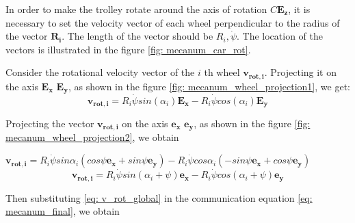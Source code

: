 \documentclass[oneside,final,14pt]{extreport}
\newcommand{\bs}{\boldsymbol}
\begin{document}
In order to make the trolley rotate around the axis of rotation $ C \bs{E_{z}} $, it is necessary to set the velocity vector of each wheel perpendicular to the radius of the vector $ \bs{R_{i}} $. The length of the vector should be $ R_{i}, \dot{\psi} $. The location of the vectors is illustrated in the figure \ref{fig: mecanum_car_rot}.

\begin{figure} [H]
\end{figure}

Consider the rotational velocity vector of the $ i $ th wheel $ \bs{v_{rot, i}} $. Projecting it on the axis $ \bs{E_{x}} $ $ \bs{E_{y}} $, as shown in the figure \ref{fig: mecanum_wheel_projection1}, we get:
\begin{equation}
\bs{v_{rot, i}}
=
R_{i}
\dot{\psi}
sin (\alpha_{i})
\bs{E_{x}}
-
R_{i}
\dot{\psi}
cos (\alpha_{i})
\bs{E_{y}}
\end{equation}

\begin{figure} [H]
\end{figure}

Projecting the vector $ \bs{v_{rot, i}} $ on the axis $ \bs{e_{x}} $ $ \bs{e_{y}} $, as shown in the figure \ref{fig: mecanum_wheel_projection2}, we obtain

$
\bs{v_{rot, i}}
=
R_{i}
\dot{\psi}
sin \alpha_{i}
(
cos \psi \bs{e_{x}}
+
sin \psi \bs{e_{y}}
)
-
R_{i}
\dot{\psi}
cos \alpha_{i}
(
-sin \psi \bs{e_{x}}
+
cos \psi \bs{e_{y}}
)
$
\begin{equation}
\label{eq: v_rot_global}
\bs{v_{rot, i}}
=
R_{i}
\dot{\psi}
sin (\alpha_{i} + \psi)
\bs{e_{x}}
-
R_{i}
\dot{\psi}
cos (\alpha_{i} + \psi)
\bs{e_{y}}
\end{equation}

\begin{figure} [H]
\end{figure}

Then substituting \ref{eq: v_rot_global} in the communication equation \ref{eq: mecanum_final}, we obtain
\end{document}
